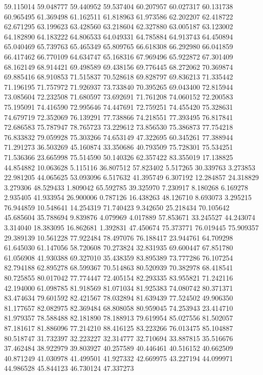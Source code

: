 59.115014
59.048777
59.440952
59.537404
60.207957
60.027317
60.131738
60.965495
61.369498
61.162511
61.818963
61.973586
62.202207
62.418722
62.671295
63.199623
63.428560
63.218604
62.327880
63.005187
63.123002
64.182890
64.183222
64.806533
64.049331
64.785884
64.913743
64.450894
65.040469
65.739763
65.465349
65.809765
66.618308
66.292980
66.041859
66.417462
66.770109
64.634747
65.168316
67.969496
65.922872
67.301409
68.162149
68.914421
69.498589
69.438156
69.776445
68.272062
70.369874
69.885416
68.910853
71.515837
70.528618
69.828797
69.836213
71.335442
71.196195
71.757972
71.926937
73.733840
70.395265
69.043400
72.815944
73.085604
72.232508
71.680597
73.692691
71.761208
74.060152
72.200583
75.195091
74.416590
72.995646
74.447691
72.759251
74.455420
75.328631
74.679719
72.352069
76.139291
77.738866
74.218551
77.393495
76.817841
72.686583
75.787947
78.765723
73.229612
73.856530
75.386873
77.754218
76.833832
79.059928
75.303266
74.653149
47.322695
60.345261
77.388944
71.291273
36.503269
45.160874
33.350686
40.793509
75.728301
75.534251
71.536366
23.665998
75.514590
50.140326
62.357422
83.355019
17.138825
44.854882
10.063628
5.115116
36.807512
57.823402
5.517265
30.339763
3.273853
22.981205
44.065625
53.093096
6.517632
41.395749
6.307192
12.284857
24.318829
3.279306
48.529433
1.809042
65.592785
39.325970
7.230917
8.180268
6.169278
2.935405
41.933954
26.900006
0.787126
16.438263
48.126710
8.693073
3.295215
76.944859
10.548641
14.254319
71.740423
9.342650
25.218434
70.105642
45.685604
35.788694
9.839876
4.079969
4.017889
57.853671
33.245527
44.243074
3.314040
18.383095
16.862681
1.392831
47.450674
75.373771
76.019445
75.909357
29.389139
10.561228
77.922484
78.497076
76.188417
23.944761
64.709298
61.645030
61.147056
58.720608
70.273824
32.831935
69.600447
67.851780
61.056908
41.930388
69.327010
35.438359
83.895389
73.777286
76.107254
82.794188
62.895278
68.599367
70.514863
80.520939
70.382978
68.418541
80.725855
80.017042
77.774447
72.405154
82.293335
83.955821
71.242116
42.194000
61.098785
81.918569
81.071034
81.925383
74.080742
80.371371
83.474634
79.601592
82.421567
78.032894
81.639439
77.524502
49.906350
81.177657
82.082975
82.369484
68.808058
80.959045
74.253943
23.414710
81.979357
78.588488
82.181890
78.188913
79.619954
85.027556
81.502057
87.181617
81.886096
77.214210
88.416125
83.223266
76.013475
85.104887
80.518747
31.732397
32.223227
32.314777
32.710694
33.887815
35.516676
37.462484
38.922979
39.803927
40.257589
40.446461
40.516152
40.662509
40.871249
41.030978
41.499501
41.927332
42.669975
43.227194
44.099971
44.986528
45.844123
46.730124
47.337273
